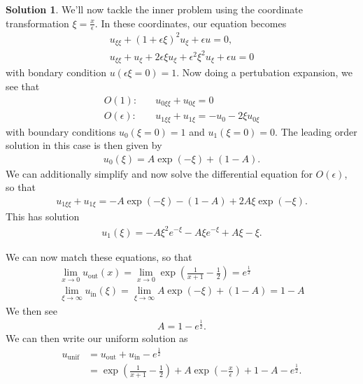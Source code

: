 \documentclass[12pt]{article}
\theoremstyle{definition}
\newtheorem{sol}{Solution}
\theoremstyle{remark}
\begin{document}
\begin{sol}
    We'll now tackle the inner problem using the coordinate transformation $\xi = \frac{x}{\epsilon}$. In these coordinates, our equation becomes
    \begin{align*}
        u_{\xi \xi} + (1 +  \epsilon\xi)^{2} u_{\xi} + \epsilon u = 0,\\
        u_{\xi \xi} + u_{\xi} + 2\epsilon \xi u_{\xi} + \epsilon^{2}\xi^{2} u_{\xi} + \epsilon u = 0
    \end{align*}
    with bondary condition  $u(\epsilon \xi = 0) = 1$. Now doing a pertubation expansion, we see that
    \begin{align*}
        O(1):  &\quad u_{0\xi \xi} + u_{0\xi} = 0\\
        O(\epsilon): &\quad u_{1\xi \xi} + u_{1\xi} = - u_{0} - 2 \xi u_{0\xi}
    \end{align*}
    with boundary conditions $u_{0}(\xi = 0) = 1$ and $u_{1}(\xi = 0) = 0$. The leading order solution in this case is then given by
    \begin{align*}
        u_{0}(\xi) = A\exp(-\xi) + (1 - A).
    \end{align*}
    We can additionally simplify and now solve the differential equation for $O(\epsilon)$, so that
     \begin{align*}
         u_{1\xi \xi} + u_{1\xi} = - A \exp(-\xi) - (1 - A) + 2 A \xi\exp(-\xi).
    \end{align*}
    This has solution
    \begin{align*}
        u_{1}(\xi) = - A \xi^{2} e^{-\xi}  - A \xi e^{-\xi} + A \xi - \xi.
    \end{align*}

    We can now match these equations, so that
    \begin{align*}
        \lim_{x\to 0} u_{\text{out}}(x) = \lim_{x\to 0} \exp\left( \frac{1}{x+1} - \frac{1}{2}\right) = e^{\frac{1}{2}}\\
        \lim_{\xi\to \infty} u_{\text{in}}(\xi) = \lim_{\xi\to \infty} A\exp(-\xi) + (1 - A) = 1 - A
\end{align*}
We then see
\begin{align*}
    A = 1 - e^{\frac{1}{2}}.
\end{align*}
We can then write our uniform solution as
\begin{align*}
    u_{\text{unif}} &= u_{\text{out}} + u_{\text{in}} - e^{\frac{1}{2}}\\
                    &= \exp \left(\frac{1}{x+1} - \frac{1}{2}\right) + A \exp\left(- \frac{x}{\epsilon}\right) + 1 -A - e^{\frac{1}{2}}.
\end{align*}



\end{sol}
\end{document}
